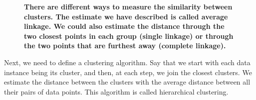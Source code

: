 \begin{figure}[h]
    \vspace{1cm}
    \centering
    \caption{\textbf{\textsf{There are different ways to measure the similarity between clusters. The estimate we have described is called average linkage. We could also estimate the distance through the two closest points in each group (single linkage) or through the two points that are furthest away (complete linkage).}}}
\end{figure}

Next, we need to define a clustering algorithm. Say that we start with each data instance being its cluster, and then, at each step, we join the closest clusters. We estimate the distance between the clusters with the average distance between all their pairs of data points. This algorithm is called hierarchical clustering.

